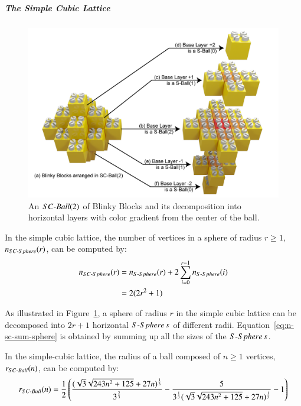 \subparagraph{\textbf{The Simple Cubic Lattice}}
\label{section:appendixLMRs:diameter-blinkyblocks}

\begin{figure}[!h]
	\centering
	\includegraphics[width=0.8\linewidth]{images/network-characterization/ball-blinkyblocks.png}
	\caption{An $\mathop{SC{\textnormal{-}Ball}}(2)$ of Blinky Blocks and its decomposition into horizontal layers with color gradient from the center of the ball.\label{fig:appendixLMRs:sc-ball}}
\end{figure}

\begin{lem}
	In the simple cubic lattice, the number of vertices in a sphere of radius $r \geq 1$, $n_{\mathop{SC{\textnormal{-}Sphere}}}(r)$, can be computed by:
	\begin{align}
	\label{eq:n-sc-sum-sphere}
	n_{\mathop{SC{\textnormal{-}Sphere}}}(r) & = n_{\mathop{S{\textnormal{-}Sphere}}}(r) + 2\sum_{i=0}^{r-1} n_{\mathop{S{\textnormal{-}Sphere}}}(i)\\
	& = 2 (2r^2 + 1)
	\label{eq:n-sc-sphere}
	\end{align}
\end{lem}

\begin{pf}
	As illustrated in Figure~\ref{fig:appendixLMRs:sc-ball}, a sphere of radius $r$ in the simple cubic lattice can be decomposed into  $2r + 1$ horizontal $\mathop{S{\textnormal{-}Sphere}}s$ of different radii. Equation~\eqref{eq:n-sc-sum-sphere} is obtained by summing up all the sizes of the $\mathop{S{\textnormal{-}Sphere}}s$.
\end{pf}

\begin{thm}
	In the simple-cubic lattice, the radius of a ball composed of $n \geq 1$ vertices, $r_{\mathop{SC{\textnormal{-}Ball}}}(n)$, can be computed by: 
	\begin{equation}
	\label{eqn:radius-3d-sc}
	r_{\mathop{SC{\textnormal{-}Ball}}}(n) = \frac{1}{2} \left(\frac{(\sqrt{3} \sqrt{243 n^2+125}+27 n)^\frac{1}{3}}{3^{\frac{2}{3}}}-\frac{5}{3^{\frac{1}{3}} (\sqrt{3} \sqrt{243 n^2+125}+27 n)^{\frac{1}{3}}} - 1\right)
	\end{equation}
\end{thm}

